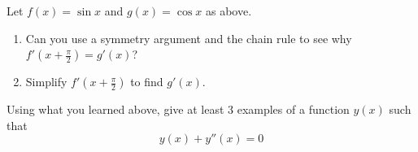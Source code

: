 \documentclass[12pt, a4paper]{article}
\begin{document}
\begin{ex}
  Let \(f(x) = \sin x\) and \(g(x) = \cos x\) as above.
  \begin{enumerate}
  \item   Can you use a
  symmetry argument and the chain rule to see why
  \(f'\left(x+\frac{\pi}{2}\right) = g'(x)\)?
  \item Simplify \(f'\left(x+\frac{\pi}{2}\right)\) to find \(g'(x)\).
  \end{enumerate}
\end{ex}
\begin{ex}
  Using what you learned above, give at least \(3\) examples of a
  function \(y(x)\) such that \[
    y(x)+y''(x) = 0
  \]
\end{ex}
\end{document}
